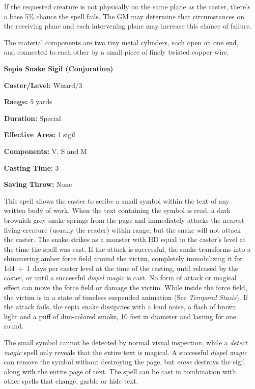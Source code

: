 \begin{multicols}{2}
If the requested creature is not physically on the same plane as the caster, there's a base 5\% chance the spell fails.  The GM may determine that circumstances on the receiving plane and each intervening plane may increase this chance of failure.  

The material components are two tiny metal cylinders, each open on one end, and connected to each other by a small piece of finely twisted copper wire.

\vspace{1em}

\noindent
\begin{minipage}{\columnwidth}

\noindent \textbf{Sepia Snake Sigil (Conjuration)}

\noindent \textbf{Caster/Level:} Wizard/3

\noindent \textbf{Range:} 5 yards

\noindent \textbf{Duration:} Special

\noindent \textbf{Effective Area:} 1 sigil

\noindent \textbf{Components:} V, S and M

\noindent \textbf{Casting Time:} 3

\noindent \textbf{Saving Throw:} None

\end{minipage}

This spell allows the caster to scribe a small symbol within the text of any written body of work.  When the text containing the symbol is read, a dark brownish grey snake springs from the page and immediately attacks the nearest living creature (usually the reader) within range, but the snake will not attack the caster.  The snake strikes as a monster with HD equal to the caster's level at the time the spell was cast.  If the attack is successful, the snake transforms into a shimmering amber force field around the victim, completely immobilizing it for 1d4~+~1 days per caster level at the time of the casting, until released by the caster, or until a successful \textit{dispel magic} is cast.  No form of attack or magical effect can move the force field or damage the victim.  While inside the force field, the victim is in a state of timeless suspended animation (See \textit{Temporal Stasis}).  If the attack fails, the sepia snake dissipates with a loud noise, a flash of brown light and a puff of dun-colored smoke, 10 feet in diameter and lasting for one round. 

The small symbol cannot be detected by normal visual inspection, while a \textit{detect magic} spell only reveals that the entire text is magical.  A successful \textit{dispel magic} can remove the symbol without destroying the page, but \textit{erase} destroys the sigil along with the entire page of text.  The spell can be cast in combination with other spells that change, garble or hide text.


\end{multicols}
